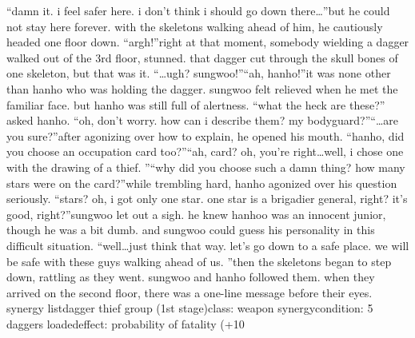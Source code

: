 “damn it.
 i feel safer here.
 i don’t think i should go down there…”but he could not stay here forever.
 with the skeletons walking ahead of him, he cautiously headed one floor down.
“argh!”right at that moment, somebody wielding a dagger walked out of the 3rd floor, stunned.
 that dagger cut through the skull bones of one skeleton, but that was it.
“…ugh? sungwoo!”“ah, hanho!”it was none other than hanho who was holding the dagger.
 sungwoo felt relieved when he met the familiar face.
 but hanho was still full of alertness.
“what the heck are these?” asked hanho.
“oh, don’t worry.
 how can i describe them? my bodyguard?”“…are you sure?”after agonizing over how to explain, he opened his mouth.
“hanho, did you choose an occupation card too?”“ah, card? oh, you’re right…well, i chose one with the drawing of a thief.
”“why did you choose such a damn thing? how many stars were on the card?”while trembling hard, hanho agonized over his question seriously.
“stars? oh, i got only one star.
 one star is a brigadier general, right? it’s good, right?”sungwoo let out a sigh.
 he knew hanhoo was an innocent junior, though he was a bit dumb.
 and sungwoo could guess his personality in this difficult situation.
“well…just think that way.
 let’s go down to a safe place.
 we will be safe with these guys walking ahead of us.
”then the skeletons began to step down, rattling as they went.
 sungwoo and hanho followed them.
 when they arrived on the second floor, there was a one-line message before their eyes.
synergy listdagger thief group (1st stage)class: weapon synergycondition: 5 daggers loadedeffect: probability of fatality (+10%

